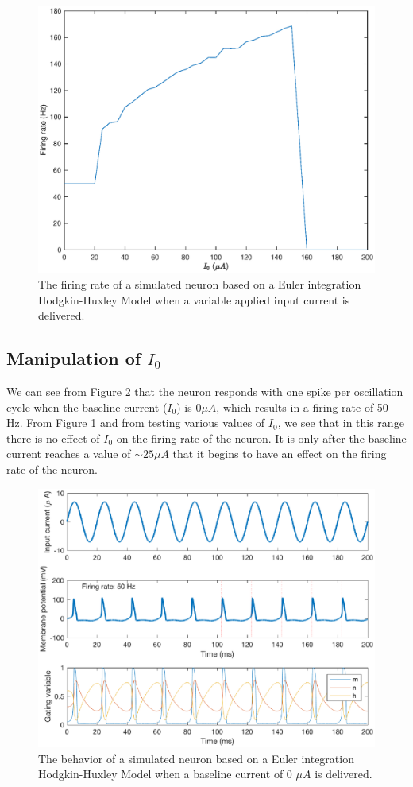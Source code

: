 \documentclass[11pt, oneside]{article}
\begin{document}
\begin{figure}[ht!]
\centering
\includegraphics[width=1\textwidth]{manipulate_I_0.eps}
\caption{The firing rate of a simulated neuron based on a Euler integration Hodgkin-Huxley Model when a variable applied input current is delivered.}
\label{fig:manipulate_I_0}
\end{figure}

\subsection{Manipulation of $I_0$}

We can see from Figure \ref{fig:I_0} that the neuron responds with one spike per oscillation cycle when the baseline current ($I_0$) is $0 \mu A$, which results in a firing rate of 50 Hz. From Figure \ref{fig:manipulate_I_0} and from testing various values of $I_0$, we see that in this range there is no effect of $I_0$ on the firing rate of the neuron. It is only after the baseline current reaches a value of $\sim 25 \mu A$ that it begins to have an effect on the firing rate of the neuron.

\begin{figure}[ht!]
\centering
\includegraphics[width=1\textwidth]{I_0.eps}
\caption{The behavior of a simulated neuron based on a Euler integration Hodgkin-Huxley Model when a baseline current of 0 $\mu A$ is delivered.}
\label{fig:I_0}
\end{figure}
\end{document}
